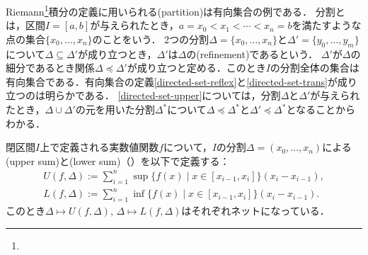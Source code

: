 \documentclass{ltjsbook}
\begin{document}
\begin{exa}
Riemann\footnote{}積分の定義に用いられる(partition)は有向集合の例である．
分割とは，区間\(I = [a, b]\)が与えられたとき，\(a = x_0 < x_1 < \cdots < x_n = b\)を満たすような点の集合\(\{x_0, \ldots, x_n\}\)のことをいう．
2つの分割\(\Delta = \{x_0, \ldots, x_n\}\)と\(\Delta' = \{y_0, \ldots, y_m\}\)について\(\Delta \subseteq \Delta' \)が成り立つとき，\(\Delta'\)は\(\Delta\)の(refinement)であるという．
\(\Delta'\)が\(\Delta\)の細分であるとき関係\(\Delta \preceq \Delta'\)が成り立つと定める．このとき\(I\)の分割全体の集合は有向集合である．有向集合の定義\ref{directed-set-reflex}と\ref{directed-set-trans}が成り立つのは明らかである．
\ref{directed-set-upper}については，分割\(\Delta\)と\(\Delta'\)が与えられたとき，\(\Delta \cup \Delta'\)の元を用いた分割\(\Delta^*\)について\(\Delta \preceq \Delta^*\)と\(\Delta' \preceq \Delta^*\)となることからわかる．

閉区間\(I\)上で定義される実数値関数\(f\)について，\(I\)の分割\(\Delta = (x_0, \ldots, x_n)\)による(upper sum)と(lower sum)（）を以下で定義する：
\begin{gather}
    U(f, \Delta) := \sum_{i = 1}^n \sup \{ f(x) \mid x \in [x_{i - 1}, x_i] \} (x_i - x_{i - 1}), \\
    L(f, \Delta) := \sum_{i = 1}^n \inf \{ f(x) \mid x \in [x_{i - 1}, x_i] \} (x_i - x_{i - 1}).
\end{gather}
このとき\(\Delta \mapsto U(f, \Delta)\), \(\Delta \mapsto L(f, \Delta)\)はそれぞれネットになっている．
\end{exa}

\end{document}

